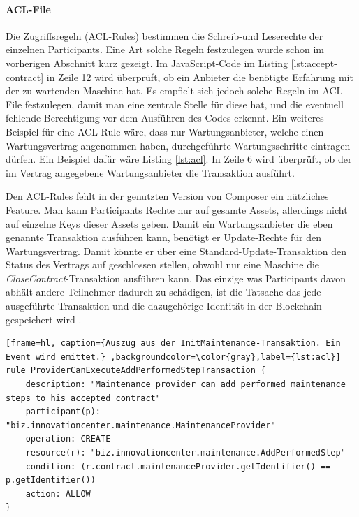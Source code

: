 \paragraph{ACL-File}
Die Zugriffsregeln (ACL-Rules) bestimmen die Schreib-und Leserechte der einzelnen Participants. Eine Art solche Regeln festzulegen wurde schon im vorherigen Abschnitt kurz gezeigt. Im JavaScript-Code im Listing \ref{lst:accept-contract} in Zeile 12 wird überprüft, ob ein Anbieter die benötigte Erfahrung mit der zu wartenden Maschine hat. Es empfielt sich jedoch solche Regeln im ACL-File festzulegen, damit man eine zentrale Stelle für diese hat, und die eventuell fehlende Berechtigung vor dem Ausführen des Codes erkennt. Ein weiteres Beispiel für eine ACL-Rule wäre, dass nur Wartungsanbieter, welche einen Wartungsvertrag angenommen haben, durchgeführte Wartungsschritte eintragen dürfen. Ein Beispiel dafür wäre Listing \ref{lst:acl}. In Zeile 6 wird überprüft, ob der im Vertrag angegebene Wartungsanbieter die Transaktion ausführt.

Den ACL-Rules fehlt in der genutzten Version von Composer ein nützliches Feature. Man kann Participants Rechte nur auf gesamte Assets, allerdings nicht auf einzelne Keys dieser Assets geben. Damit ein Wartungsanbieter die eben genannte Transaktion ausführen kann, benötigt er Update-Rechte für den Wartungsvertrag. Damit könnte er über eine Standard-Update-Transaktion den Status des Vertrags auf geschlossen stellen, obwohl nur eine Maschine die \textit{CloseContract}-Transaktion ausführen kann. Das einzige was Participants davon abhält andere Teilnehmer dadurch zu schädigen, ist die Tatsache das jede ausgeführte Transaktion und die dazugehörige Identität in der Blockchain gespeichert wird \cite{SchererPerformanceScalabilityBlockchain2017}.
\begin{lstfloat}
\begin{lstlisting}[frame=hl, caption={Auszug aus der InitMaintenance-Transaktion. Ein Event wird emittet.} ,backgroundcolor=\color{gray},label={lst:acl}]
rule ProviderCanExecuteAddPerformedStepTransaction {
    description: "Maintenance provider can add performed maintenance steps to his accepted contract"
    participant(p): "biz.innovationcenter.maintenance.MaintenanceProvider"
    operation: CREATE
    resource(r): "biz.innovationcenter.maintenance.AddPerformedStep"
    condition: (r.contract.maintenanceProvider.getIdentifier() == p.getIdentifier())
    action: ALLOW
}
\end{lstlisting} 
\end{lstfloat}

